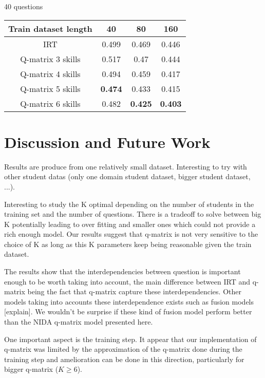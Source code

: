 \documentclass{sig-alternate}
\begin{document}
40 questions

\begin{tabular}{cccc}
\bfseries Train dataset length & 40 & 80 & 160\\
\hline
IRT & 0.499 & 0.469 & 0.446\\
Q-matrix 3 skills & 0.517 & 0.47 & 0.444\\
Q-matrix 4 skills & 0.494 & 0.459 & 0.417\\
Q-matrix 5 skills & \textbf{0.474} & 0.433 & 0.415\\
Q-matrix 6 skills & 0.482 & \textbf{0.425} & \textbf{0.403}\\
\end{tabular}

\section{Discussion and Future Work}
Results are produce from one relatively small dataset. Interesting to try with other student datas (only one domain student dataset, bigger student dataset, ...). 

Interesting to study the K optimal depending on the number of students in the training set and the number of questions. There is a tradeoff to solve between big K potentially leading to over fitting and smaller ones which could not provide a rich enough model. Our results suggest that q-matrix is not very sensitive to the choice of K as long as this K parameters keep being reasonable given the train dataset. 

The results show that the interdependencies between question is important enough to be worth taking into account, the main difference between IRT and q-matrix being the fact that q-matrix capture these interdependencies. Other models taking into accounts these interdependence exists such as fusion models [explain]. We wouldn't be surprise if these kind of fusion model perform better than the NIDA q-matrix model presented here. 

One important aspect is the training step. It appear that our implementation of q-matrix was limited by the approximation of the q-matrix done during the training step and amelioration can be done in this direction, particularly for bigger q-matrix ($K \ge 6$). 




\end{document}
